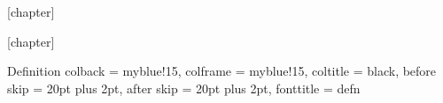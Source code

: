 
\newcommand{\N}{\mathbb{N}}          %
\newcommand{\Z}{\mathbb{Z}}          %
\newcommand{\Q}{\mathbb{Q}}          %
\newcommand{\R}{\mathbb{R}}          %
\newcommand{\C}{\mathbb{C}}          %
\newcommand{\ind}{\mathbbm{1}}       %
\newcommand{\bigO}{\mathcal{O}}      %
\renewcommand{\vec}[1]{\bm{#1}}      %
\usepackage{xcolor}
\usepackage{pgfplots}

\theoremstyle{plain}                 %

\theoremstyle{definition}          	%
[chapter]
\newenvironment{eks}{
\bigskip
\refstepcounter{example}
\textbf{Example~\thechapter.\theexample}
\phantom{.}\newline\noindent\rule{\textwidth}{0.4pt}
}
{\phantom{.}\newline\rule{\textwidth}{0.4pt}}  

[chapter]
\renewenvironment{proof}{
\bigskip
\refstepcounter{proof}
\textbf{Bevis~\thechapter.\theproof}
\phantom{.}\newline\noindent}
{\qed}  

{Definition}
{
colback		= myblue!15,
colframe	= myblue!15,
coltitle	= black,
before skip	= 20pt plus 2pt,
after skip	= 20pt plus 2pt,
fonttitle	= \bfseries
}
{defn}

